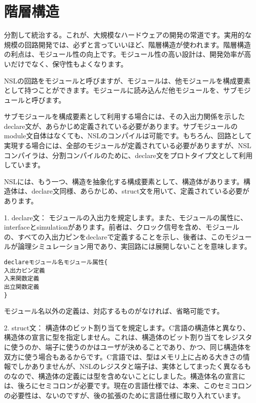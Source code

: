 \chapter{階層構造}
\label{chap:hierarchy}

分割して統治する。これが、大規模なハードウェアの開発の常道です。実用的な規模の回路開発では、必ずと言っていいほど、階層構造が使われます。階層構造の利点は、モジュール性の向上です。モジュール性の高い設計は、開発効率が高いだけでなく、保守性もよくなります。

NSLの回路をモジュールと呼びますが、モジュールは、他モジュールを構成要素として持つことができます。モジュールに読み込んだ他モジュールを、サブモジュールと呼びます。

サブモジュールを構成要素として利用する場合には、その入出力関係を示したdeclare文が、あらかじめ定義されている必要があります。サブモジュールのmodule文自体はなくても、NSLのコンパイルは可能です。もちろん、回路として実現する場合には、全部のモジュールが定義されている必要がありますが、NSLコンパイラは、分割コンパイルのために、declare文をプロトタイプ文として利用しています。

NSLには、もう一つ、構造を抽象化する構成要素として、構造体があります。構造体は、declare文同様、あらかじめ、struct文を用いて、定義されている必要があります。

1. declare文： モジュールの入出力を規定します。また、モジュールの属性に、interfaceとsimulationがあります。前者は、クロック信号を含め、モジュールの、すべての入出力ピンをdeclareで定義することを示し、後者は、このモジュールが論理シミュレーション用であり、実回路には展開しないことを意味します。

\begin{reviewemlist}
\begin{alltt}
declare モジュール名 モジュール属性 \{
  入出力ピン定義
入来関数定義
出立関数定義
\}
\end{alltt}
\end{reviewemlist}

モジュール名以外の定義は、対応するものがなければ、省略可能です。

2. struct文： 構造体のビット割り当てを規定します。C言語の構造体と異なり、構造体の宣言に型を指定しません。これは、構造体のビット割り当てをレジスタに使うのか、端子に使うのかはユーザが決めることであり、かつ、同じ構造体を双方に使う場合もあるからです。C言語では、型はメモリ上に占める大きさの情報でしかありませんが、NSLのレジスタと端子は、実体としてまったく異なるものなので、構造体の定義には型を含めないことにしました。構造体名の宣言には、後ろにセミコロンが必要です。現在の言語仕様では、本来、このセミコロンの必要性は、ないのですが、後の拡張のために言語仕様に取り入れています。


